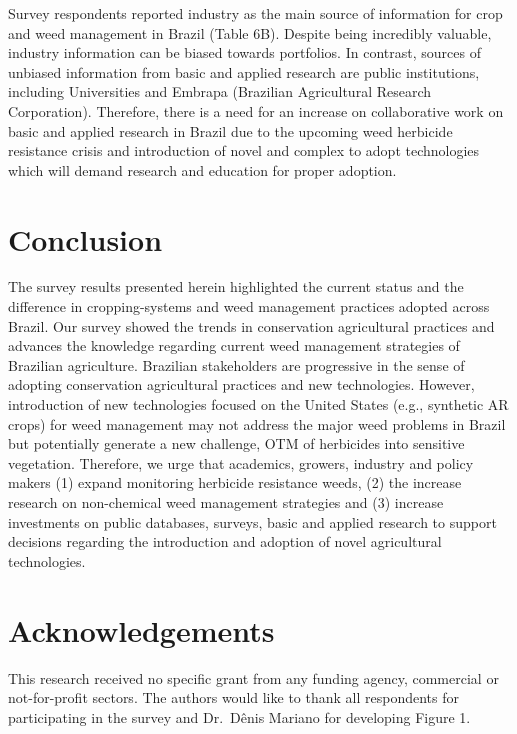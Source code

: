 \documentclass[
  12pt,
  a4paper]{article}
\begin{document}
Survey respondents reported industry as the main source of information
for crop and weed management in Brazil (Table 6B). Despite being
incredibly valuable, industry information can be biased towards
portfolios. In contrast, sources of unbiased information from basic and
applied research are public institutions, including Universities and
Embrapa (Brazilian Agricultural Research Corporation). Therefore, there
is a need for an increase on collaborative work on basic and applied
research in Brazil due to the upcoming weed herbicide resistance crisis
and introduction of novel and complex to adopt technologies which will
demand research and education for proper adoption.

\hypertarget{conclusion}{%
\section{Conclusion}\label{conclusion}}

The survey results presented herein highlighted the current status and
the difference in cropping-systems and weed management practices adopted
across Brazil. Our survey showed the trends in conservation agricultural
practices and advances the knowledge regarding current weed management
strategies of Brazilian agriculture. Brazilian stakeholders are
progressive in the sense of adopting conservation agricultural practices
and new technologies. However, introduction of new technologies focused
on the United States (e.g., synthetic AR crops) for weed management may
not address the major weed problems in Brazil but potentially generate a
new challenge, OTM of herbicides into sensitive vegetation. Therefore,
we urge that academics, growers, industry and policy makers (1) expand
monitoring herbicide resistance weeds, (2) the increase research on
non-chemical weed management strategies and (3) increase investments on
public databases, surveys, basic and applied research to support
decisions regarding the introduction and adoption of novel agricultural
technologies.

\hypertarget{acknowledgements}{%
\section{Acknowledgements}\label{acknowledgements}}

This research received no specific grant from any funding agency,
commercial or not-for-profit sectors. The authors would like to thank
all respondents for participating in the survey and Dr.~Dênis Mariano
for developing Figure 1.
\end{document}
